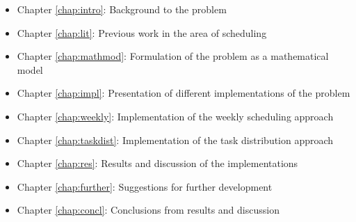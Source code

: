 \begin{itemize}
	\item Chapter \ref{chap:intro}: Background to the problem 
	\item Chapter \ref{chap:lit}: Previous work in the area of scheduling
	\item Chapter \ref{chap:mathmod}: Formulation of the problem as a mathematical model
	\item Chapter \ref{chap:impl}: Presentation of different implementations of the problem
	\item Chapter \ref{chap:weekly}: Implementation of the weekly scheduling approach 
	\item Chapter \ref{chap:taskdist}: Implementation of the task distribution approach 
	\item Chapter \ref{chap:res}: Results and discussion of the implementations
	\item Chapter \ref{chap:further}: Suggestions for further development
	\item Chapter \ref{chap:concl}: Conclusions from results and discussion
\end{itemize}




\iffalse



